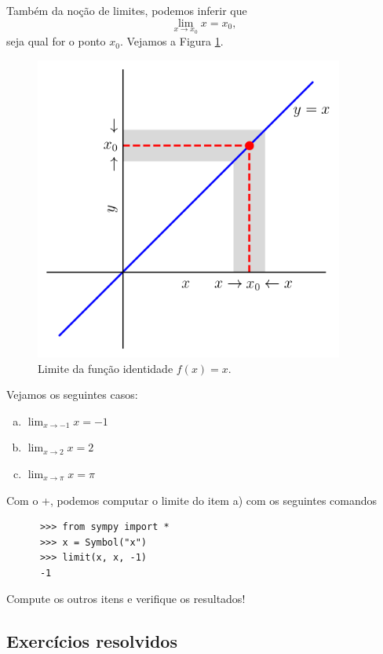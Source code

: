 Também da noção de limites, podemos inferir que
\begin{equation}
  \lim_{x\to x_0} x = x_0,
\end{equation}
seja qual for o ponto $x_0$. Vejamos a Figura \ref{fig:lim_funid}.

\begin{figure}[H]
  \centering
  \includegraphics[width=4in]{./cap_lim/dados/fig_lim_funid/fig.png}
  \caption{Limite da função identidade $f(x)=x$.}
  \label{fig:lim_funid}
\end{figure}

\begin{ex}
  Vejamos os seguintes casos:
  \begin{enumerate}[a)]
  \item $\displaystyle \lim_{x\to -1} x = -1$
  \item $\displaystyle \lim_{x\to 2} x = 2$
  \item $\displaystyle \lim_{x\to \pi} x = \pi$
  \end{enumerate}
    \ifispython
    Com o {\python}+{\sympy}, podemos computar o limite do item a) com os seguintes comandos
    \begin{lstlisting}
      >>> from sympy import *
      >>> x = Symbol("x")
      >>> limit(x, x, -1)
      -1
    \end{lstlisting}
    Compute os outros itens e verifique os resultados!
    \fi
\end{ex}

\subsection{Exercícios resolvidos}

